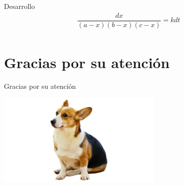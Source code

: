 \documentclass[
  10pt,
  ignorenonframetext,
  aspectratio=169,
]{beamer}
\begin{document}
\begin{frame}
\begin{block}{Desarrollo}
\label{desarrollo-1}
\[\begin{split}
\dfrac{dx}{(a-x)(b-x)(c-x)} = k dt \\
\end{split}\]
\end{block}
\end{frame}

\section{Gracias por su atención}\label{gracias-por-su-atenciuxf3n}

\begin{frame}{Gracias por su atención}
\begin{center}

\includegraphics[width=0.6\textwidth,height=\textheight]{./images/dog.png}

\end{center}
\end{frame}
\end{document}
